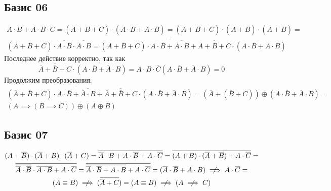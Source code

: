 \documentclass[a4paper,10pt]{article} %
\begin{document}
	\subsection{Базис 06}
	\begin{multline*}
	\overline{A} \cdot \overline{B} + A \cdot B \cdot C = 
	(\overline{A} + \overline{B} + C) 
	\cdot (\overline{A} \cdot \overline{B} + A \cdot B) =
	(\overline{A} + \overline{B} + C) 
	\cdot (\overline{A} + B) \cdot (A + \overline{B}) = \\
	(\overline{A} + \overline{B} + C) \cdot \overline{A \cdot \overline{B}}
	\cdot \overline{\overline{A} \cdot B} = 
	(\overline{A} + \overline{B} + C) \cdot 
	\overline{A \cdot \overline{B} + \overline{\overline{A} \cdot B}} +
	\overline{\overline{A} + \overline{B} + C} 
	\cdot (A \cdot \overline{B} + \overline{A} \cdot B)
	\end{multline*}
	Последнее действие корректно, так как
	\begin{equation*}
		\overline{\overline{A} + \overline{B} + C} 
		\cdot (A \cdot \overline{B} + \overline{A} \cdot B) =
		A \cdot B \cdot \overline{C} (A \cdot \overline{B} + \overline{A} \cdot B) =
		0
	\end{equation*}
	Продолжим преобразования:
	\begin{multline*}
	(\overline{A} + \overline{B} + C) \cdot 
	\overline{A \cdot \overline{B} + \overline{\overline{A} \cdot B}} +
	\overline{\overline{A} + \overline{B} + C} 
	\cdot (A \cdot \overline{B} + \overline{A} \cdot B) =
	(\overline{A} + (\overline{B} + C)) 
	\oplus (A \cdot \overline{B} + \overline{A} \cdot B) = \\
	(A \implies (B \implies C)) \oplus (A \oplus B)
	\end{multline*}
	
	\subsection{Базис 07}
	
	\begin{multline*}
		(A + \overline{B}) \cdot (\overline{A} + B) \cdot (\overline{A} + C) =
		\overline{\overline{A} \cdot B + A \cdot \overline{B} + A \cdot \overline{C}} = 
		\overline{(A + B) \cdot (\overline{A} + \overline{B}) +
		 A \cdot \overline{C}} = \\
	 	\overline{\overline{\overline{A} \cdot \overline{B}} 
	 	\cdot \overline{A \cdot B} + A \cdot \overline{C}} = 
 		\overline{\overline{\overline{A} \cdot \overline{B}
 		+ A \cdot B} + A \cdot \overline{C}} = 
 		(\overline{A} \cdot \overline{B} + A \cdot B) 
 		\centernot\implies A \cdot \overline{C} = \\
 		(A \equiv B) \centernot\implies (\overline{\overline{A} + C}) =
 		(A \equiv B) \centernot\implies (A \centernot\implies C)
	\end{multline*}
\end{document}
